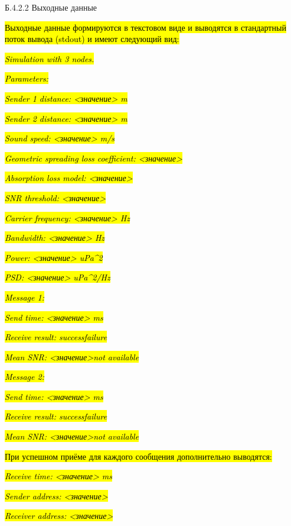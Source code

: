 Б.4.2.2 Выходные данные\hl{}

\hl{Выходные данные формируются в текстовом виде и выводятся в
стандартный поток вывода (stdout) и имеют следующий вид:}

\emph{\hl{Simulation with 3 nodes.}}

\emph{\hl{Parameters:}}

\emph{\hl{Sender 1 distance: \textless значение\textgreater{} m}}

\emph{\hl{Sender 2 distance: \textless значение\textgreater{} m}}

\emph{\hl{Sound speed: \textless значение\textgreater{} m/s}}

\emph{\hl{Geometric spreading loss coefficient:
\textless значение\textgreater{}}}

\emph{\hl{Absorption loss model: \textless значение\textgreater{}}}

\emph{\hl{SNR threshold: \textless значение\textgreater{}}}

\emph{\hl{Carrier frequency: \textless значение\textgreater{} Hz}}

\emph{\hl{Bandwidth: \textless значение\textgreater{} Hz}}

\emph{\hl{Power: \textless значение\textgreater{} uPa\^{}2}}

\emph{\hl{PSD: \textless значение\textgreater{} uPa\^{}2/Hz}}

\emph{\hl{Message 1:}}

\emph{\hl{Send time: \textless значение\textgreater{} ms}}

\emph{\hl{Receive result: success\textbar failure}}

\emph{\hl{Mean SNR: \textless значение\textgreater\textbar not
available}}

\emph{\hl{Message 2:}}

\emph{\hl{Send time: \textless значение\textgreater{} ms}}

\emph{\hl{Receive result: success\textbar failure}}

\emph{\hl{Mean SNR: \textless значение\textgreater\textbar not
available}}

\hl{При успешном приёме для каждого сообщения дополнительно выводятся:}

\emph{\hl{Receive time: \textless значение\textgreater{} ms}}

\emph{\hl{Sender address: \textless значение\textgreater{}}}

\emph{\hl{Receiver address: \textless значение\textgreater{}}}

